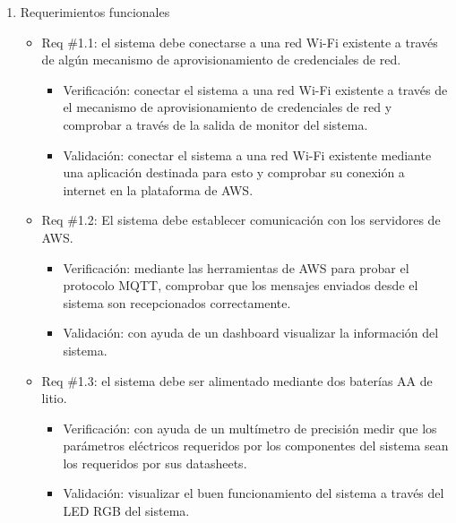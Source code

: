 \documentclass[
11pt, %
]{plan}
\begin{document}
\begin{enumerate}
	\item Requerimientos funcionales
		\begin{itemize}
			\item Req \#1.1: el sistema debe conectarse a una red Wi-Fi existente a través de algún mecanismo de aprovisionamiento de credenciales de red.

			\begin{itemize}
				\item Verificación: conectar el sistema a una red Wi-Fi existente a través de el mecanismo de aprovisionamiento de credenciales de red y comprobar a través de la salida de monitor del sistema.
				\item Validación: conectar el sistema a una red Wi-Fi existente mediante una aplicación destinada para esto y comprobar su conexión a internet en la plataforma de AWS.
			\end{itemize}

		\end{itemize}
		
		\begin{itemize}
			\item Req \#1.2: El sistema debe establecer comunicación con los servidores de AWS.

			\begin{itemize}
				\item Verificación: mediante las herramientas de AWS para probar el protocolo MQTT, comprobar que los mensajes enviados desde el sistema son recepcionados correctamente.
				\item Validación: con ayuda de un dashboard visualizar la información del sistema.
			\end{itemize}
		\end{itemize}
		
		\begin{itemize}
			\item Req \#1.3: el sistema debe ser alimentado mediante dos baterías AA de litio.

			\begin{itemize}
				\item Verificación: con ayuda de un multímetro de precisión medir que los parámetros eléctricos requeridos por los componentes del sistema sean los requeridos por sus datasheets.
				\item Validación: visualizar el buen funcionamiento del sistema a través del LED RGB del sistema.
			\end{itemize}


\end{itemize}
\end{enumerate}
\end{document}
